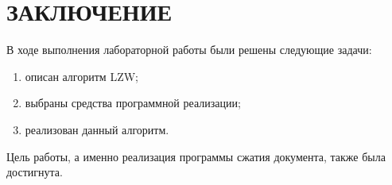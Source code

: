 \chapter*{ЗАКЛЮЧЕНИЕ}

В ходе выполнения лабораторной работы были решены следующие задачи:

\begin{enumerate}[label={\arabic*)}]
	\item описан алгоритм LZW;
	\item выбраны средства программной реализации;
	\item реализован данный алгоритм.
\end{enumerate}

Цель работы, а именно реализация программы сжатия документа, также была достигнута.
